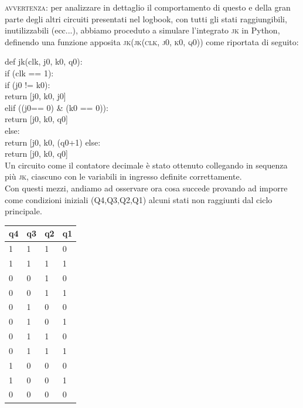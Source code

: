 \documentclass[journal, a4paper]{IEEEtran}
\begin{document}
\textsc{avvertenza}: per analizzare in dettaglio il comportamento di questo e della gran parte degli altri circuiti presentati nel logbook, con tutti gli stati raggiungibili, inutilizzabili (ecc...), abbiamo proceduto a simulare l'integrato \textsc{jk} in Python, definendo una funzione apposita \textsc{jk(jk(clk, j0, k0, q0))} come riportata di seguito:

def jk(clk, j0, k0, q0):\\
    if (clk == 1):\\
        if (j0 != k0):\\
            return [j0, k0, j0] \\
        elif ((j0== 0) \& (k0 == 0)):\\
            return [j0, k0, q0]\\
        else:\\
            return [j0, k0, (q0+1)%
    else:\\
        return [j0, k0, q0]\\

Un circuito come il contatore decimale è stato ottenuto collegando in sequenza più \textsc{jk}, ciascuno con le variabili in ingresso definite correttamente.\\

Con questi mezzi, andiamo ad osservare ora cosa succede provando ad imporre come condizioni iniziali (Q4,Q3,Q2,Q1) alcuni stati non raggiunti dal ciclo principale.\\

\begin{table}[h]
\centering
\begin{tabular}{l|l|l|l}
\textbf{q4} &\textbf{ q3} & \textbf{q2} & \textbf{q1} \\
\hline
1 & 1 & 1 & 0 \\

1 & 1 & 1 & 1 \\

0 & 0 & 1 & 0 \\

0 & 0 & 1 & 1 \\

0 & 1 & 0 & 0 \\

0 & 1 & 0 & 1 \\

0 & 1 & 1 & 0 \\

0 & 1 & 1 & 1 \\

1 & 0 & 0 & 0 \\

1 & 0 & 0 & 1 \\

0 & 0 & 0 & 0 \\
\hline
\end{tabular}
\end{table}
~\\
\end{document}
